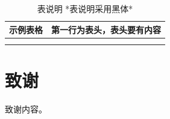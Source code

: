 \documentclass{cjc}
\begin{document}
\begin{table}[htb]
  \centering
  \caption{表说明 *表说明采用黑体*}
  \small
  \begin{tabular}{cc}
    \toprule
    示例表格 & 第一行为表头，表头要有内容 \\
    \midrule
    & \\
    \midrule
    & \\
    \bottomrule
  \end{tabular}
\end{table}







\section*{致谢}
致谢内容。


\nocite{*}


\end{document}
